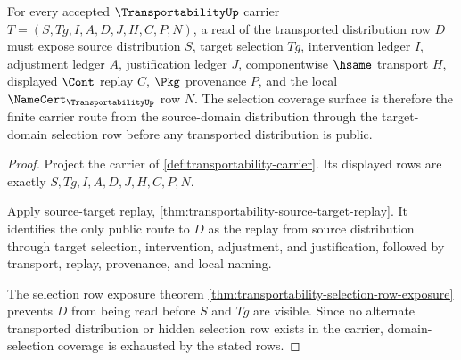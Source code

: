 \begin{theorem}
\label{thm:transportability-domain-selection-coverage}
For every accepted $\TransportabilityUp$ carrier $T=(S,Tg,I,A,D,J,H,C,P,N)$, a read of the transported distribution row $D$ must expose source distribution $S$, target selection $Tg$, intervention ledger $I$, adjustment ledger $A$, justification ledger $J$, componentwise $\hsame$ transport $H$, displayed $\Cont$ replay $C$, $\Pkg$ provenance $P$, and the local $\NameCert_{\TransportabilityUp}$ row $N$. The selection coverage surface is therefore the finite carrier route from the source-domain distribution through the target-domain selection row before any transported distribution is public.
\end{theorem}
\begin{proof}
Project the carrier of \autoref{def:transportability-carrier}. Its displayed rows are exactly $S,Tg,I,A,D,J,H,C,P,N$.

Apply source-target replay, \autoref{thm:transportability-source-target-replay}. It identifies the only public route to $D$ as the replay from source distribution through target selection, intervention, adjustment, and justification, followed by transport, replay, provenance, and local naming.

The selection row exposure theorem \autoref{thm:transportability-selection-row-exposure} prevents $D$ from being read before $S$ and $Tg$ are visible. Since no alternate transported distribution or hidden selection row exists in the carrier, domain-selection coverage is exhausted by the stated rows.
\end{proof}

